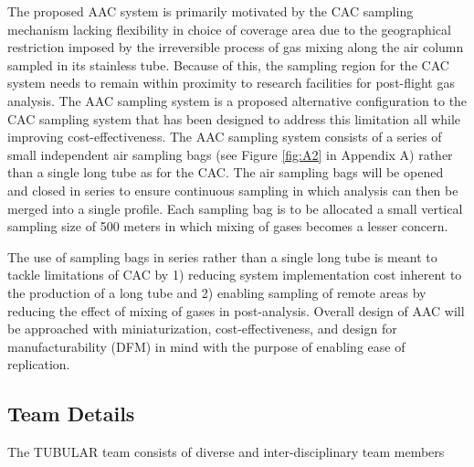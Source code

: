 \documentclass[a4paper,12pt,twoside]{article}
\begin{document}
The proposed AAC system is primarily motivated by the CAC sampling mechanism lacking flexibility in choice of coverage area due to the geographical restriction imposed by the irreversible process of gas mixing along the air column sampled in its stainless tube. Because of this, the sampling region for the CAC system needs to remain within proximity to research facilities for post-flight gas analysis. The AAC sampling system is a proposed alternative configuration to the CAC sampling system that has been designed to address this limitation all while improving cost-effectiveness. The AAC sampling system consists of a series of small independent air sampling bags (see Figure \ref{fig:A2} in Appendix A) rather than a single long tube as for the CAC. The air sampling bags will be opened and closed in series to ensure continuous sampling in which analysis can then be merged into a single profile. Each sampling bag is to be allocated a small vertical sampling size of 500 meters in which mixing of gases becomes a lesser concern.

The use of sampling bags in series rather than a single long tube is meant to tackle limitations of CAC by 1) reducing system implementation cost inherent to the production of a long tube and 2) enabling sampling of remote areas by reducing the effect of mixing of gases in post-analysis. Overall design of AAC will be approached with miniaturization, cost-effectiveness, and design for manufacturability (DFM) in mind with the purpose of enabling ease of replication.
\pagebreak
\subsection{Team Details}
The TUBULAR team consists of diverse and inter-disciplinary team members 

\bigskip
\end{document}
